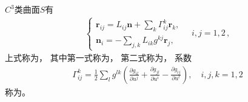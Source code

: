 \begin{theorem}
    $C^3$类曲面$S$有
    \begin{align}\label{eq:03ex01.35}
        \left\{\begin{array}{l}
            \displaystyle\bm r_{ij}=L_{ij}\bm n+\sum\limits_{k}{\varGamma_{ij}^k\bm r_k}, \\
            \displaystyle\bm n_i=-\sum\limits_{j,k}{L_{ik}g^{kj}\bm r_j},
        \end{array}\right.\quad i,j=1,2\, ,
    \end{align}
    上式称为，
    其中第一式称为，
    第二式称为，
    系数
    \begin{align}\label{eq:03ex01.36}
        \varGamma_{ij}^k=\frac{1}{2}\sum\limits_{l}{g^{lk}\left(\frac{\partial g_{il}}{\partial u^j}+\frac{\partial g_{jl}}{\partial u^i}-\frac{\partial g_{ij}}{\partial u^l}\right)},\quad i,j,k=1,2
    \end{align}
    称为。
\end{theorem}
